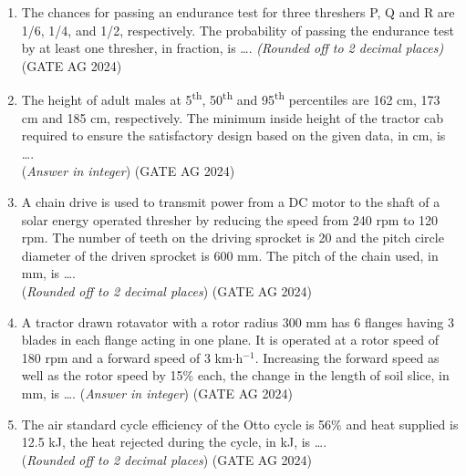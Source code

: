 \documentclass[journal]{IEEEtran}
\begin{document}
\begin{enumerate}
   \medskip
  
\item
The chances for passing an endurance test for three threshers P, Q and R are 1/6, 1/4, and 1/2, respectively. The probability of passing the endurance test by at least one thresher, in fraction, is \dots. \textit{(Rounded off to 2 decimal places)}
 \hfill(GATE AG 2024)\\

 \medskip

\item
The height of adult males at 5\textsuperscript{th}, 50\textsuperscript{th} and 95\textsuperscript{th} percentiles are 162 cm, 173 cm and 185 cm, respectively. The minimum inside height of the tractor cab required to ensure the satisfactory design based on the given data, in cm, is \dots.\\
(\textit{Answer in integer})
 \hfill(GATE AG 2024)\\

\medskip

\item
A chain drive is used to transmit power from a DC motor to the shaft of a solar energy operated thresher by reducing the speed from 240 rpm to 120 rpm. The number of teeth on the driving sprocket is 20 and the pitch circle diameter of the driven sprocket is 600 mm. The pitch of the chain used, in mm, is \dots.\\
(\textit{Rounded off to 2 decimal places})
 \hfill(GATE AG 2024)\\

\medskip

\item
A tractor drawn rotavator with a rotor radius 300 mm has 6 flanges having 3 blades in each flange acting in one plane. It is operated at a rotor speed of 180 rpm and a forward speed of 3 km$\cdot$h$^{-1}$. Increasing the forward speed as well as the rotor speed by 15\% each, the change in the length of soil slice, in mm, is \dots. (\textit{Answer in integer})
 \hfill(GATE AG 2024)\\

\medskip

\item
The air standard cycle efficiency of the Otto cycle is 56\% and heat supplied is 12.5 kJ, the heat rejected during the cycle, in kJ, is \dots.\\
(\textit{Rounded off to 2 decimal places})
 \hfill(GATE AG 2024)\\


\end{enumerate}
\end{document}
